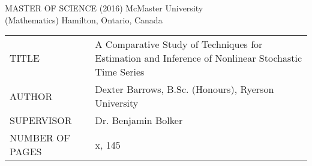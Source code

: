 \newpage
\thispagestyle{empty}
\centering
\null


MASTER OF SCIENCE (2016) 	\hfill 	McMaster University \\
(Mathematics)				\hfill	Hamilton, Ontario, Canada \\

\vspace{3cm}

\begin{tabular}{p{5cm}p{10cm}}
	TITLE 			& A Comparative Study of Techniques for Estimation and Inference of Nonlinear Stochastic Time Series \\
	AUTHOR 			& Dexter Barrows, B.Sc. (Honours), Ryerson University \\
	SUPERVISOR 		& Dr. Benjamin Bolker \\
	NUMBER OF PAGES & x, 145 \\
\end{tabular}